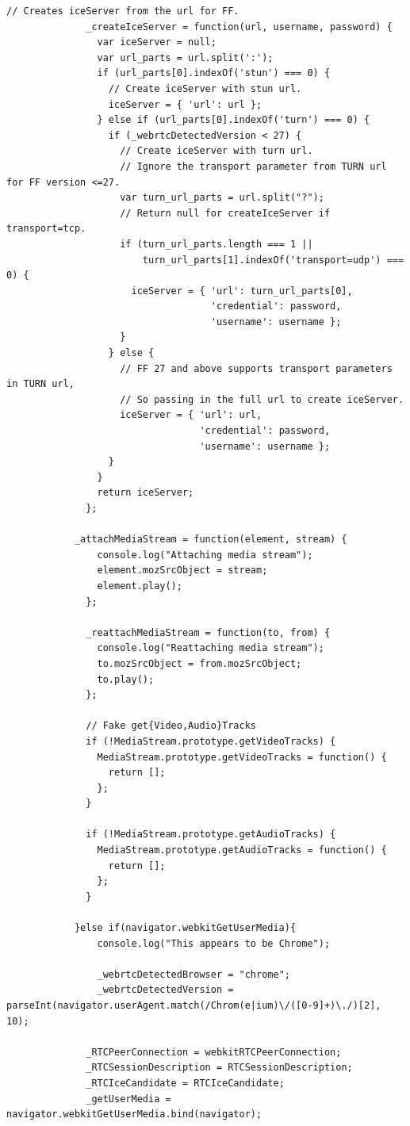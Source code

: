 \begin{appendices}
\begin{lstlisting}[caption={WebRTCService.js in application client},label={code:webrtc_service}]
  			// Creates iceServer from the url for FF.
			  _createIceServer = function(url, username, password) {
			    var iceServer = null;
			    var url_parts = url.split(':');
			    if (url_parts[0].indexOf('stun') === 0) {
			      // Create iceServer with stun url.
			      iceServer = { 'url': url };
			    } else if (url_parts[0].indexOf('turn') === 0) {
			      if (_webrtcDetectedVersion < 27) {
			        // Create iceServer with turn url.
			        // Ignore the transport parameter from TURN url for FF version <=27.
			        var turn_url_parts = url.split("?");
			        // Return null for createIceServer if transport=tcp.
			        if (turn_url_parts.length === 1 ||
			            turn_url_parts[1].indexOf('transport=udp') === 0) {
			          iceServer = { 'url': turn_url_parts[0],
			                        'credential': password,
			                        'username': username };
			        }
			      } else {
			        // FF 27 and above supports transport parameters in TURN url,
			        // So passing in the full url to create iceServer.
			        iceServer = { 'url': url,
			                      'credential': password,
			                      'username': username };
			      }
			    }
			    return iceServer;
			  };

  			_attachMediaStream = function(element, stream) {
			    console.log("Attaching media stream");
			    element.mozSrcObject = stream;
			    element.play();
			  };

			  _reattachMediaStream = function(to, from) {
			    console.log("Reattaching media stream");
			    to.mozSrcObject = from.mozSrcObject;
			    to.play();
			  };

			  // Fake get{Video,Audio}Tracks
			  if (!MediaStream.prototype.getVideoTracks) {
			    MediaStream.prototype.getVideoTracks = function() {
			      return [];
			    };
			  }

			  if (!MediaStream.prototype.getAudioTracks) {
			    MediaStream.prototype.getAudioTracks = function() {
			      return [];
			    };
			  }

			}else if(navigator.webkitGetUserMedia){
				console.log("This appears to be Chrome");

				_webrtcDetectedBrowser = "chrome";
				_webrtcDetectedVersion = parseInt(navigator.userAgent.match(/Chrom(e|ium)\/([0-9]+)\./)[2], 10);

			  _RTCPeerConnection = webkitRTCPeerConnection;
			  _RTCSessionDescription = RTCSessionDescription;
			  _RTCIceCandidate = RTCIceCandidate;
			  _getUserMedia = navigator.webkitGetUserMedia.bind(navigator);


\end{lstlisting}
\end{appendices}
